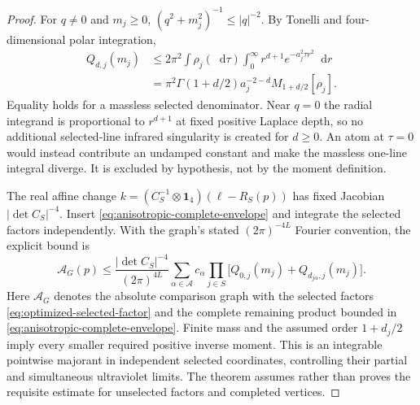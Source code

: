 \documentclass[final,5p,times,twocolumn,numbers,nopreprintline]{elsarticle}
\numberwithin{equation}{section}
\theoremstyle{definition}
\theoremstyle{remark}
\newcommand{\dd}{\mathop{}\!\mathrm d}
\newcommand{\one}{\mathbf 1}
\begin{document}
\begin{proof}
For $q\ne0$ and $m_j\geq0$,
$(q^2+m_j^2)^{-1}\leq|q|^{-2}$. By Tonelli and four-dimensional
polar integration,
\[
 \begin{aligned}
 Q_{d,j}(m_j)&\leq2\pi^2\int\rho_j(\dd\tau)
   \int_0^\infty r^{d+1}e^{-a_j^2\tau r^2}\dd r\\
 &=\pi^2\Gamma(1+d/2)a_j^{-2-d}
                   M_{1+d/2}[\rho_j].
 \end{aligned}
\]
Equality holds for a massless selected denominator. Near $q=0$ the
radial integrand is proportional to $r^{d+1}$ at fixed positive
Laplace depth, so no additional selected-line infrared singularity
is created for $d\geq0$. An atom at $\tau=0$ would instead contribute
an undamped constant and make the massless one-line integral diverge.
It is excluded by hypothesis, not by the moment definition.

The real affine change
$k=(C_S^{-1}\otimes\one_4)(\ell-R_S(p))$ has fixed Jacobian
$|\det C_S|^{-4}$. Insert \eqref{eq:anisotropic-complete-envelope} and integrate
the selected factors independently. With the graph's stated
$(2\pi)^{-4L}$ Fourier convention, the explicit bound is
\begin{equation}
 \mathcal A_G(p)\leq
 \frac{|\det C_S|^{-4}}{(2\pi)^{4L}}
 \sum_{\alpha\in\mathcal A}c_\alpha
 \prod_{j\in S}\bigl[Q_{0,j}(m_j)+Q_{d_{j\alpha},j}(m_j)\bigr].
 \label{eq:anisotropic-integrated-bound}
\end{equation}
Here $\mathcal A_G$ denotes the absolute comparison graph with
the selected factors \eqref{eq:optimized-selected-factor} and
the complete remaining product bounded in
\eqref{eq:anisotropic-complete-envelope}.
Finite mass and the assumed order $1+d_j/2$ imply every smaller
required positive inverse moment. This is an integrable pointwise
majorant in independent selected coordinates, controlling their
partial and simultaneous ultraviolet limits. The theorem assumes
rather than proves the requisite estimate for unselected factors and
completed vertices.
\end{proof}
\end{document}
